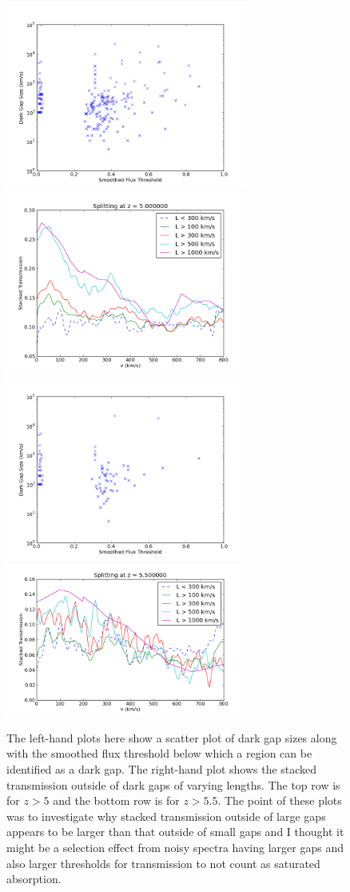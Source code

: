 \documentclass[11pt]{article}
\begin{document}
\begin{figure}[h]
  \centering
  \includegraphics[width=8cm]{LvsT.png}
  \includegraphics[width=8cm]{Stack_Zgreaterthan5.png}
  \includegraphics[width=8cm]{LvsT_zGreaterThan5p5.png}
  \includegraphics[width=8cm]{Stack_Zgreaterthan5p5.png}
  \caption{The left-hand plots here show a scatter plot of dark gap sizes along with the smoothed flux threshold below which a region can be identified as a dark gap. The right-hand plot shows the stacked transmission outside of dark gaps of varying lengths. The top row is for $z > 5$ and the bottom row is for $z > 5.5$. The point of these plots was to investigate why stacked transmission outside of large gaps appears to be larger than that outside of small gaps and I thought it might be a selection effect from noisy spectra having larger gaps and also larger thresholds for transmission to not count as saturated absorption.}
  \label{fig:todo}
\end{figure}
\end{document}
